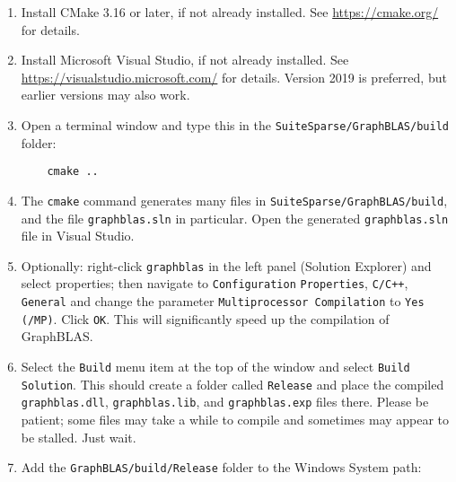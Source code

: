 \documentclass[12pt]{article}
\begin{document}
\begin{enumerate}

\item Install CMake 3.16 or later, if not already installed.
    See \url{https://cmake.org/} for details.

\item Install Microsoft Visual Studio, if not already installed.
    See \url{https://visualstudio.microsoft.com/} for details.
    Version 2019 is preferred, but earlier versions may also work.

\item Open a terminal window and type this in the
    \verb'SuiteSparse/GraphBLAS/build' folder:

    \vspace{-0.1in}
    {\small
    \begin{verbatim}
    cmake ..  \end{verbatim} }
    \vspace{-0.1in}

\item The \verb'cmake' command generates many files in
    \verb'SuiteSparse/GraphBLAS/build', and the file \verb'graphblas.sln' in
    particular.  Open the generated \verb'graphblas.sln' file in Visual Studio.

\item Optionally: right-click \verb'graphblas' in the left panel (Solution
    Explorer) and select properties; then navigate to \verb'Configuration'
    \verb'Properties', \verb'C/C++', \verb'General' and change the parameter
    \verb'Multiprocessor Compilation' to \verb'Yes (/MP)'.  Click \verb'OK'.
    This will significantly speed up the compilation of GraphBLAS.

\item Select the \verb'Build' menu item at the top of the window and
    select \verb'Build Solution'.  This should create a folder called
    \verb'Release' and place the compiled \verb'graphblas.dll',
    \verb'graphblas.lib', and \verb'graphblas.exp' files there.  Please be
    patient; some files may take a while to compile and sometimes may appear to
    be stalled.  Just wait.


\item Add the \verb'GraphBLAS/build/Release' folder to the Windows System path:


\end{enumerate}
\end{document}
